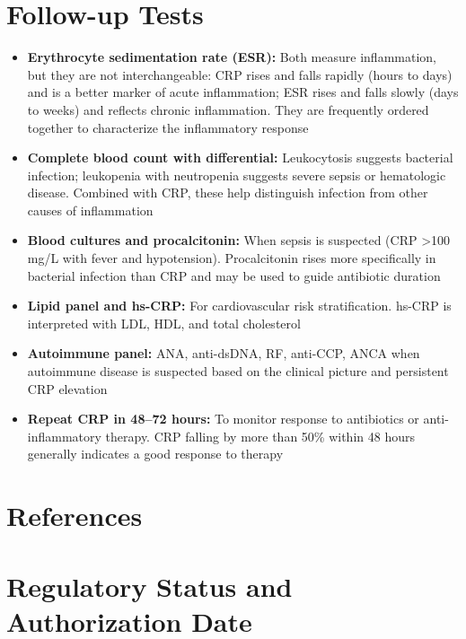 \section*{Follow-up Tests}
\begin{itemize}
  \item \textbf{Erythrocyte sedimentation rate (ESR):} Both measure inflammation, but they are not interchangeable: CRP rises and falls rapidly (hours to days) and is a better marker of acute inflammation; ESR rises and falls slowly (days to weeks) and reflects chronic inflammation. They are frequently ordered together to characterize the inflammatory response
  \item \textbf{Complete blood count with differential:} Leukocytosis suggests bacterial infection; leukopenia with neutropenia suggests severe sepsis or hematologic disease. Combined with CRP, these help distinguish infection from other causes of inflammation
  \item \textbf{Blood cultures and procalcitonin:} When sepsis is suspected (CRP >100 mg/L with fever and hypotension). Procalcitonin rises more specifically in bacterial infection than CRP and may be used to guide antibiotic duration
  \item \textbf{Lipid panel and hs-CRP:} For cardiovascular risk stratification. hs-CRP is interpreted with LDL, HDL, and total cholesterol
  \item \textbf{Autoimmune panel:} ANA, anti-dsDNA, RF, anti-CCP, ANCA when autoimmune disease is suspected based on the clinical picture and persistent CRP elevation
  \item \textbf{Repeat CRP in 48--72 hours:} To monitor response to antibiotics or anti-inflammatory therapy. CRP falling by more than 50\% within 48 hours generally indicates a good response to therapy
\end{itemize}

\section*{References}



\clearpage
\section*{Regulatory Status and Authorization Date}

\clearpage
